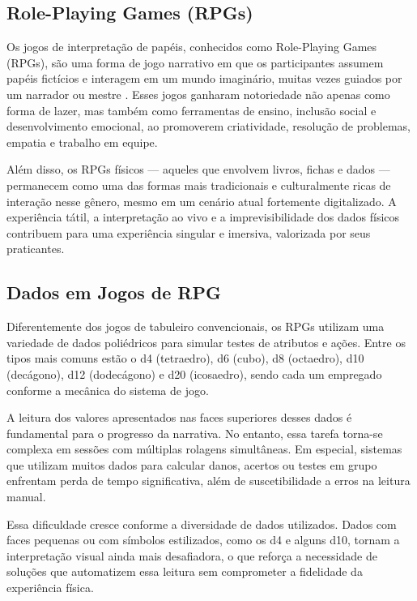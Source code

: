 \subsection{Role-Playing Games (RPGs)}

Os jogos de interpretação de papéis, conhecidos como Role-Playing
Games (RPGs), são uma forma de jogo narrativo em que os
participantes assumem papéis fictícios e interagem em um mundo
imaginário, muitas vezes guiados por um narrador ou mestre
\cite{hitchens2007roleplaying}. Esses jogos ganharam notoriedade
não apenas como forma de lazer, mas também como ferramentas de
ensino, inclusão social e desenvolvimento emocional, ao promoverem
criatividade, resolução de problemas, empatia e trabalho em equipe.

Além disso, os RPGs físicos — aqueles que envolvem livros, fichas
e dados — permanecem como uma das formas mais tradicionais e
culturalmente ricas de interação nesse gênero, mesmo em um cenário
atual fortemente digitalizado. A experiência tátil, a interpretação
ao vivo e a imprevisibilidade dos dados físicos contribuem para
uma experiência singular e imersiva, valorizada por seus praticantes.

\subsection{Dados em Jogos de RPG}

Diferentemente dos jogos de tabuleiro convencionais, os RPGs
utilizam uma variedade de dados poliédricos para simular testes
de atributos e ações. Entre os tipos mais comuns estão o d4
(tetraedro), d6 (cubo), d8 (octaedro), d10 (decágono), d12
(dodecágono) e d20 (icosaedro), sendo cada um empregado conforme
a mecânica do sistema de jogo.

A leitura dos valores apresentados nas faces superiores desses
dados é fundamental para o progresso da narrativa. No entanto,
essa tarefa torna-se complexa em sessões com múltiplas rolagens
simultâneas. Em especial, sistemas que utilizam muitos dados para
calcular danos, acertos ou testes em grupo enfrentam perda de tempo
significativa, além de suscetibilidade a erros na leitura manual.

Essa dificuldade cresce conforme a diversidade de dados utilizados.
Dados com faces pequenas ou com símbolos estilizados, como os d4
e alguns d10, tornam a interpretação visual ainda mais desafiadora,
o que reforça a necessidade de soluções que automatizem essa
leitura sem comprometer a fidelidade da experiência física.


